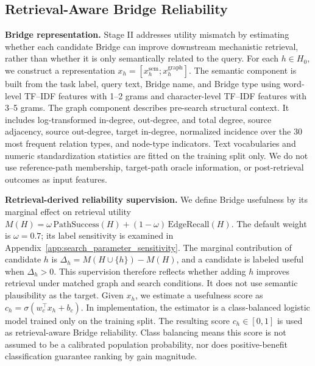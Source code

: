 \documentclass{article} %
\newcommand{\rev}[1]{{\color{blue}#1}}
\begin{document}
\subsection{Retrieval-Aware Bridge Reliability}
\label{sec:bridge_reliability}

\noindent\textbf{Bridge representation.} Stage II addresses utility mismatch by estimating whether each candidate Bridge can improve downstream mechanistic retrieval, rather than whether it is only semantically related to the query. For each $h\in H_0$, we construct a representation $x_h=[x_h^{\mathrm{sem}};x_h^{\mathrm{graph}}]$. The semantic component is built from the task label, query text, Bridge name, and Bridge type using word-level TF--IDF features with 1--2 grams and character-level TF--IDF features with 3--5 grams. The graph component describes pre-search structural context. It includes log-transformed in-degree, out-degree, and total degree, source adjacency, source out-degree, target in-degree, normalized incidence over the 30 most frequent relation types, and node-type indicators. Text vocabularies and numeric standardization statistics are fitted on the training split only. We do not use reference-path membership, target-path oracle information, or post-retrieval outcomes as input features.

\noindent\textbf{Retrieval-derived reliability supervision.} We define Bridge usefulness by its marginal effect on retrieval utility $M(H)=\omega\,\mathrm{PathSuccess}(H)+(1-\omega)\,\mathrm{EdgeRecall}(H)$. The default weight is $\omega=0.7$; its label sensitivity is examined in Appendix~\ref{app:search_parameter_sensitivity}. The marginal contribution of candidate $h$ is $\Delta_h=M(H\cup\{h\})-M(H)$, and a candidate is labeled useful when $\Delta_h>0$. This supervision therefore reflects whether adding $h$ improves retrieval under matched graph and search conditions. It does not use semantic plausibility as the target. Given $x_h$, we estimate a usefulness score as $c_h=\sigma(w_c^\top x_h+b_c)$. In implementation, the estimator is a class-balanced logistic model trained only on the training split. The resulting score $c_h\in[0,1]$ is used as retrieval-aware Bridge reliability. Class balancing means this score is \rev{not assumed to be a calibrated population probability, nor does positive-benefit classification guarantee ranking by gain magnitude.}
\end{document}
